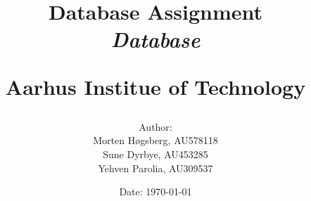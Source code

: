 \newcommand{\authorName}{}
\newcommand{\titleName}{Database Assignment}
\newcommand{\subject}{Database}
\newcommand{\institute}{Aarhus Institue of Technology}
\begin{titlepage}
  \centering
    \title
    {
      \Huge \textbf{\titleName}\\
      \scale{\numberSQRTTWO}{\vspace{\sol pt}}
      \LARGE \textit{\subject}
      \scale{\numberSQRTTWO}{\rule{\linewidth}{\sol pt}}

      \textbf{\institute}
      \author
    {
      \LARGE Author: \textit{\authorName} \\
      Morten Høgsberg, AU578118 \\
      Sune Dyrbye, AU453285 \\
      Yehven Parolia, AU309537
    }
      \date{\LARGE Date: \today}
    }
\end{titlepage}
